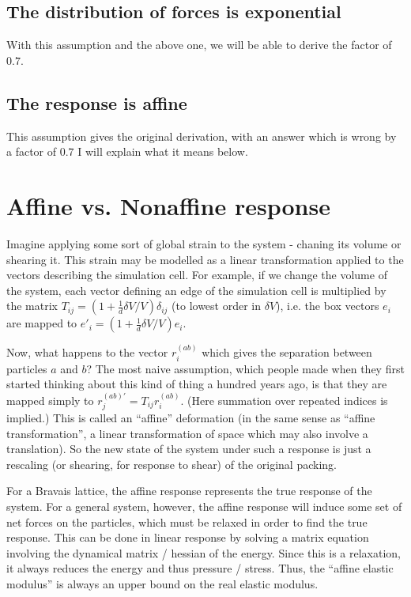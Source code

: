 \documentclass[aps,prl,twocolumn,letter,longbibliography,floatfix]{revtex4-1}
\begin{document}
\subsection{The distribution of forces is exponential}

With this assumption and the above one, we will be able to derive the factor of $0.7$.

\subsection{The response is affine}
This assumption gives the original derivation, with an answer which is wrong by a factor of $0.7$ I will explain what it means below.

\section{Affine vs. Nonaffine response}

Imagine applying some sort of global strain to the system - chaning its volume or shearing it. This strain may be modelled as a linear transformation applied to the vectors describing the simulation cell. For example, if we change the volume of the system, each vector defining an edge of the simulation cell is multiplied by the matrix $T_{ij} = \left(1 + \frac{1}{d}\delta V/V \right) \delta_{ij}$ (to lowest order in $\delta V$), i.e. the box vectors $e_i$ are mapped to $e'_i = \left(1 + \frac{1}{d}\delta V/V \right) e_i$. 

Now, what happens to the vector $r^{\left(ab\right)}_i$ which gives the separation between particles $a$ and $b$? The most naive assumption, which people made when they first started thinking about this kind of thing a hundred years ago, is that they are mapped simply to $r^{\left(ab\right)'}_j = T_{ij} r^{\left(ab\right)}_i$.  (Here summation over repeated indices is implied.) This is called an ``affine'' deformation (in the same sense as ``affine transformation'', a linear transformation  of space which may also involve a translation). So the new state of the system under such a response is just a rescaling (or shearing, for response to shear) of the original packing.

For a Bravais lattice, the affine response represents the true response of the system. For a general system, however, the affine response will induce some set of net forces on the particles, which must be relaxed in order to find the true response. This can be done in linear response by solving a matrix equation involving the dynamical matrix / hessian of the energy. Since this is a relaxation, it always reduces the energy and thus pressure / stress. Thus, the ``affine elastic modulus'' is always an upper bound on the real elastic modulus.
\end{document}
